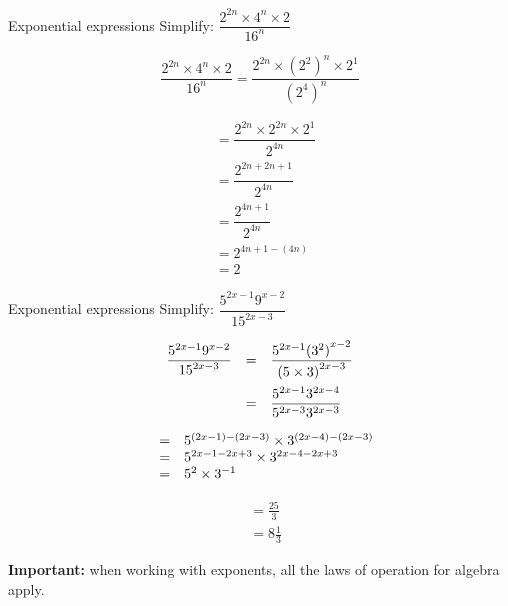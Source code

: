 \begin{wex}
{Exponential expressions}
{Simplify: $\dfrac{2^{2n} \times 4^n \times 2}{16^n}$}
{
\begin{equation*}
  \dfrac{2^{2n} \times 4^n \times 2}{16^n} = \dfrac{2^{2n} \times (2^2)^n \times 2^1}{(2^4)^n} 
\end{equation*}

\begin{align*}
  &= \dfrac{2^{2n} \times 2^{2n} \times 2^1}{2^{4n}} \\
  &= \dfrac{2^{2n + 2n +1}}{2^{4n}} \\
  &= \dfrac{2^{4n+1}}{2^{4n}} \\
  &= 2^{4n+1-(4n)} \\
  &= 2
\end{align*}
}
\end{wex}

     
\begin{wex}
{Exponential expressions}
{Simplify: $\dfrac{{5}^{2x-1}{9}^{x-2}}{{15}^{2x-3}}$}
{
\begin{equation*}
\begin{array}{lcl} \dfrac{{5}^{2x-1}  {9}^{x-2}}{{15}^{2x-3}}& =& \dfrac{{5}^{2x-1}  {({3}^{2})}^{x-2}}{{(5\times3)}^{2x-3}}\hfill \vspace{5pt}\\
		  & =& \dfrac{{5}^{2x-1}  {3}^{2x-4}}{{5}^{2x-3}  {3}^{2x-3}}\hfill 
\end{array}
\end{equation*}
  
\begin{equation*}
\begin{array}{lcl}
& =& {5}^{(2x-1)-(2x-3)} \times {3}^{(2x-4)-(2x-3)}\hfill \\ 
& =& 5^{2x-1-2x+3} \times 3^{2x-4 - 2x+3} \\
& =& {5}^{2} \times {3}^{-1}\hfill \end{array}
\end{equation*}


\begin{align*}
  &= \frac{25}{3} \\
  &= 8\frac{1}{3}
\end{align*}
}
\end{wex}

\textbf{Important:} when working with exponents, all the laws of operation for algebra apply.

